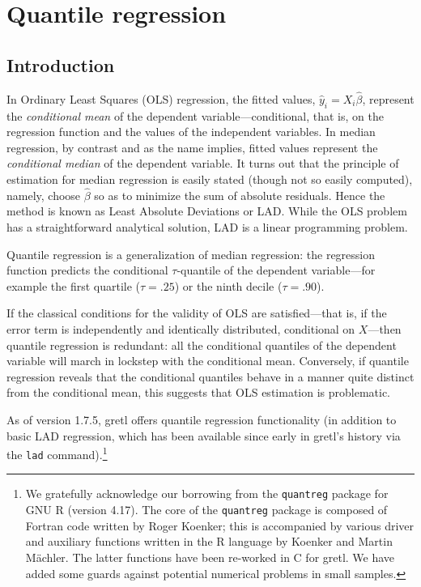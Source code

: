 \chapter{Quantile regression}
\label{chap:quantreg}

\section{Introduction}
\label{sec:rq-intro}

In Ordinary Least Squares (OLS) regression, the fitted values,
$\hat{y}_i = X_i\hat{\beta}$, represent the \emph{conditional mean} of
the dependent variable---conditional, that is, on the regression
function and the values of the independent variables.  In median
regression, by contrast and as the name implies, fitted values
represent the \emph{conditional median} of the dependent variable.  It
turns out that the principle of estimation for median regression is
easily stated (though not so easily computed), namely, choose
$\hat{\beta}$ so as to minimize the sum of absolute residuals.  Hence
the method is known as Least Absolute Deviations or LAD.  While the OLS
problem has a straightforward analytical solution, LAD is a linear
programming problem.

Quantile regression is a generalization of median regression: the
regression function predicts the conditional $\tau$-quantile of the
dependent variable---for example the first quartile ($\tau = .25$)
or the ninth decile ($\tau = .90$).

If the classical conditions for the validity of OLS are
satisfied---that is, if the error term is independently and
identically distributed, conditional on $X$---then quantile regression
is redundant: all the conditional quantiles of the dependent variable
will march in lockstep with the conditional mean.  Conversely, if
quantile regression reveals that the conditional quantiles behave in a
manner quite distinct from the conditional mean, this suggests that
OLS estimation is problematic.

As of version 1.7.5, gretl offers quantile regression
functionality (in addition to basic LAD regression, which has been
available since early in gretl's history via the \texttt{lad}
command).\footnote{We gratefully acknowledge our borrowing from the
  \texttt{quantreg} package for GNU \textsf{R} (version 4.17).  The
  core of the \texttt{quantreg} package is composed of Fortran code
  written by Roger Koenker; this is accompanied by various driver and
  auxiliary functions written in the \textsf{R} language by Koenker
  and Martin M\"achler.  The latter functions have been re-worked in C
  for gretl.  We have added some guards against potential
  numerical problems in small samples.}

